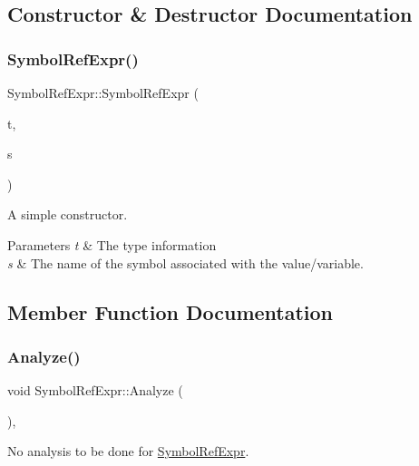 \subsection{Constructor \& Destructor Documentation}
\mbox{\label{class_symbol_ref_expr_afc8337c9c2794b7221ef3f3356e5928b}} 
\subsubsection{\texorpdfstring{Symbol\+Ref\+Expr()}{SymbolRefExpr()}}
{\footnotesize\ttfamily Symbol\+Ref\+Expr\+::\+Symbol\+Ref\+Expr (\begin{DoxyParamCaption}\item[{\hyperlink{class_type_info}{Type\+Info} $\ast$}]{t,  }\item[{const char $\ast$}]{s }\end{DoxyParamCaption})}

A simple constructor. 
\begin{DoxyParams}{Parameters}
{\em t} & The type information \\
\hline
{\em s} & The name of the symbol associated with the value/variable. \\
\hline
\end{DoxyParams}


\subsection{Member Function Documentation}
\mbox{\label{class_symbol_ref_expr_aa410e63dd4602d66bda4e880afdb82e9}} 
\subsubsection{\texorpdfstring{Analyze()}{Analyze()}}
{\footnotesize\ttfamily void Symbol\+Ref\+Expr\+::\+Analyze (\begin{DoxyParamCaption}{ }\end{DoxyParamCaption})\hspace{0.3cm}{\ttfamily [inline]}, {\ttfamily [virtual]}}

No analysis to be done for \hyperlink{class_symbol_ref_expr}{Symbol\+Ref\+Expr}. 

